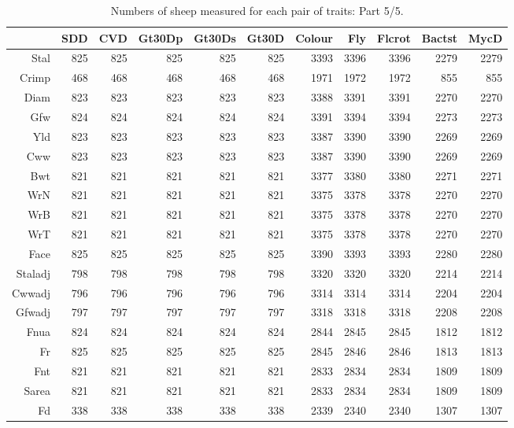 \begin{table}[p]
\footnotesize
\centering
\caption{Numbers of sheep measured for each pair of traits: Part 5/5.} 
\label{tab:counts5}
\begin{tabular}{rrrrrrrrrrr}
  \hline
 & SDD & CVD & Gt30Dp & Gt30Ds & Gt30D & Colour & Fly & Flcrot & Bactst & MycD \\ 
  \hline
Stal & 825 & 825 & 825 & 825 & 825 & 3393 & 3396 & 3396 & 2279 & 2279 \\ 
  Crimp & 468 & 468 & 468 & 468 & 468 & 1971 & 1972 & 1972 & 855 & 855 \\ 
  Diam & 823 & 823 & 823 & 823 & 823 & 3388 & 3391 & 3391 & 2270 & 2270 \\ 
  Gfw & 824 & 824 & 824 & 824 & 824 & 3391 & 3394 & 3394 & 2273 & 2273 \\ 
  Yld & 823 & 823 & 823 & 823 & 823 & 3387 & 3390 & 3390 & 2269 & 2269 \\ 
  Cww & 823 & 823 & 823 & 823 & 823 & 3387 & 3390 & 3390 & 2269 & 2269 \\ 
  Bwt & 821 & 821 & 821 & 821 & 821 & 3377 & 3380 & 3380 & 2271 & 2271 \\ 
  WrN & 821 & 821 & 821 & 821 & 821 & 3375 & 3378 & 3378 & 2270 & 2270 \\ 
  WrB & 821 & 821 & 821 & 821 & 821 & 3375 & 3378 & 3378 & 2270 & 2270 \\ 
  WrT & 821 & 821 & 821 & 821 & 821 & 3375 & 3378 & 3378 & 2270 & 2270 \\ 
  Face & 825 & 825 & 825 & 825 & 825 & 3390 & 3393 & 3393 & 2280 & 2280 \\ 
  Staladj & 798 & 798 & 798 & 798 & 798 & 3320 & 3320 & 3320 & 2214 & 2214 \\ 
  Cwwadj & 796 & 796 & 796 & 796 & 796 & 3314 & 3314 & 3314 & 2204 & 2204 \\ 
  Gfwadj & 797 & 797 & 797 & 797 & 797 & 3318 & 3318 & 3318 & 2208 & 2208 \\ 
  Fnua & 824 & 824 & 824 & 824 & 824 & 2844 & 2845 & 2845 & 1812 & 1812 \\ 
  Fr & 825 & 825 & 825 & 825 & 825 & 2845 & 2846 & 2846 & 1813 & 1813 \\ 
  Fnt & 821 & 821 & 821 & 821 & 821 & 2833 & 2834 & 2834 & 1809 & 1809 \\ 
  Sarea & 821 & 821 & 821 & 821 & 821 & 2833 & 2834 & 2834 & 1809 & 1809 \\ 
  Fd & 338 & 338 & 338 & 338 & 338 & 2339 & 2340 & 2340 & 1307 & 1307 \\ 

\end{tabular}
\end{table}
